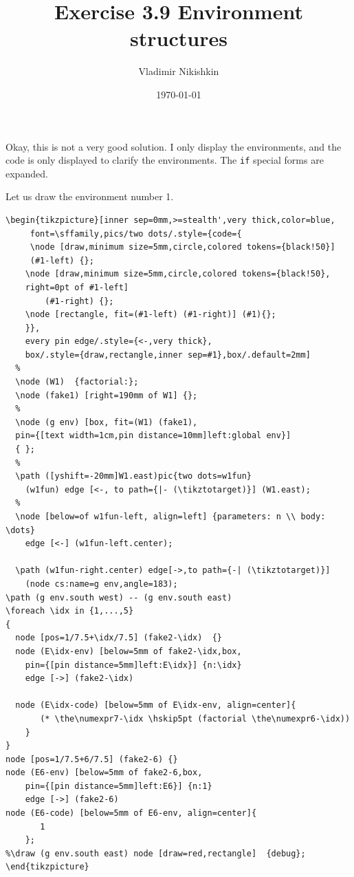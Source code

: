 \documentclass[a4paper,12pt,twoside]{report}
\author{Vladimir Nikishkin}
\date{\today}
\title{Exercise 3.9 Environment structures}
\begin{document}
\maketitle
\tableofcontents

Okay, this is not a very good solution. I only display the
environments, and the code is only displayed to clarify the
environments. The \texttt{if} special forms are expanded.

Let us draw the environment number 1.

\lstset{numbers=left,frame=single,language=[LaTeX]TeX,label=org49f75d7,caption= ,captionpos=b}
\begin{lstlisting}
\begin{tikzpicture}[inner sep=0mm,>=stealth',very thick,color=blue,
     font=\sffamily,pics/two dots/.style={code={
     \node [draw,minimum size=5mm,circle,colored tokens={black!50}]
     (#1-left) {};
    \node [draw,minimum size=5mm,circle,colored tokens={black!50},
    right=0pt of #1-left]
        (#1-right) {};
    \node [rectangle, fit=(#1-left) (#1-right)] (#1){};
    }},
    every pin edge/.style={<-,very thick},
    box/.style={draw,rectangle,inner sep=#1},box/.default=2mm]
  %
  \node (W1)  {factorial:};
  \node (fake1) [right=190mm of W1] {};
  %
  \node (g env) [box, fit=(W1) (fake1),
  pin={[text width=1cm,pin distance=10mm]left:global env}]
  { };
  %
  \path ([yshift=-20mm]W1.east)pic{two dots=w1fun}
    (w1fun) edge [<-, to path={|- (\tikztotarget)}] (W1.east);
  %
  \node [below=of w1fun-left, align=left] {parameters: n \\ body: \dots}
    edge [<-] (w1fun-left.center);

  \path (w1fun-right.center) edge[->,to path={-| (\tikztotarget)}]
    (node cs:name=g env,angle=183);
\path (g env.south west) -- (g env.south east)
\foreach \idx in {1,...,5}
{
  node [pos=1/7.5+\idx/7.5] (fake2-\idx)  {}
  node (E\idx-env) [below=5mm of fake2-\idx,box,
    pin={[pin distance=5mm]left:E\idx}] {n:\idx}
    edge [->] (fake2-\idx)

  node (E\idx-code) [below=5mm of E\idx-env, align=center]{
       (* \the\numexpr7-\idx \hskip5pt (factorial \the\numexpr6-\idx))
    }
}
node [pos=1/7.5+6/7.5] (fake2-6) {}
node (E6-env) [below=5mm of fake2-6,box,
    pin={[pin distance=5mm]left:E6}] {n:1}
    edge [->] (fake2-6)
node (E6-code) [below=5mm of E6-env, align=center]{
       1
    };
%\draw (g env.south east) node [draw=red,rectangle]  {debug};
\end{tikzpicture}
\end{lstlisting}
\end{document}
